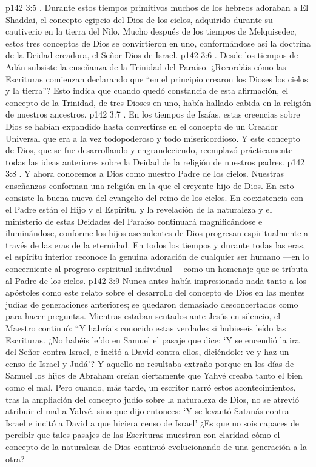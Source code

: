 \vs p142 3:5 . Durante estos tiempos primitivos muchos de los hebreos adoraban a El Shaddai, el concepto egipcio del Dios de los cielos, adquirido durante su cautiverio en la tierra del Nilo. Mucho después de los tiempos de Melquisedec, estos tres conceptos de Dios se convirtieron en uno, conformándose así la doctrina de la Deidad creadora, el Señor Dios de Israel.
\vs p142 3:6 . Desde los tiempos de Adán subsiste la enseñanza de la Trinidad del Paraíso. ¿Recordáis cómo las Escrituras comienzan declarando que “en el principio crearon los Dioses los cielos y la tierra”? Esto indica que cuando quedó constancia de esta afirmación, el concepto de la Trinidad, de tres Dioses en uno, había hallado cabida en la religión de nuestros ancestros.
\vs p142 3:7 . En los tiempos de Isaías, estas creencias sobre Dios se habían expandido hasta convertirse en el concepto de un Creador Universal que era a la vez todopoderoso y todo misericordioso. Y este concepto de Dios, que se fue desarrollando y engrandeciendo, reemplazó prácticamente todas las ideas anteriores sobre la Deidad de la religión de nuestros padres.
\vs p142 3:8 . Y ahora conocemos a Dios como nuestro Padre de los cielos. Nuestras enseñanzas conforman una religión en la que el creyente  hijo de Dios. En esto consiste la buena nueva del evangelio del reino de los cielos. En coexistencia con el Padre están el Hijo y el Espíritu, y la revelación de la naturaleza y el ministerio de estas Deidades del Paraíso continuará magnificándose e iluminándose, conforme los hijos ascendentes de Dios progresan espiritualmente a través de las eras de la eternidad. En todos los tiempos y durante todas las eras, el espíritu interior reconoce la genuina adoración de cualquier ser humano ---en lo concerniente al progreso espiritual individual--- como un homenaje que se tributa al Padre de los cielos.
\vs p142 3:9 \pc Nunca antes había impresionado nada tanto a los apóstoles como este relato sobre el desarrollo del concepto de Dios en las mentes judías de generaciones anteriores; se quedaron demasiado desconcertados como para hacer preguntas. Mientras estaban sentados ante Jesús en silencio, el Maestro continuó: “Y habríais conocido estas verdades si hubieseis leído las Escrituras. ¿No habéis leído en Samuel el pasaje que dice: ‘Y se encendió la ira del Señor contra Israel, e incitó a David contra ellos, diciéndole: ve y haz un censo de Israel y Judá’? Y aquello no resultaba extraño porque en los días de Samuel los hijos de Abraham creían ciertamente que Yahvé creaba tanto el bien como el mal. Pero cuando, más tarde, un escritor narró estos acontecimientos, tras la ampliación del concepto judío sobre la naturaleza de Dios, no se atrevió atribuir el mal a Yahvé, sino que dijo entonces: ‘Y se levantó Satanás contra Israel e incitó a David a que hiciera censo de Israel’ ¿Es que no sois capaces de percibir que tales pasajes de las Escrituras muestran con claridad cómo el concepto de la naturaleza de Dios continuó evolucionando de una generación a la otra?
